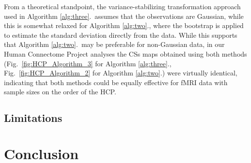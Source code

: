From a theoretical standpoint, the variance-stabilizing transformation approach used in Algorithm \ref{alg:three}.\ assumes that the observations are Gaussian, while this is somewhat relaxed for Algorithm \ref{alg:two}., where the bootstrap is applied to estimate the standard deviation directly from the data. While this supports that Algorithm \ref{alg:two}.\ may be preferable for non-Gaussian data, in our Human Connectome Project analyses the CSs maps obtained using both methods (Fig.\ \ref{fig:HCP_Algorithm_3} for Algorithm \ref{alg:three}., Fig.\ \ref{fig:HCP_Algorithm_2} for Algorithm \ref{alg:two}.) were virtually identical, indicating that both methods could be equally effective for fMRI data with sample sizes on the order of the HCP. 


\subsection{Limitations}

\section{Conclusion}
